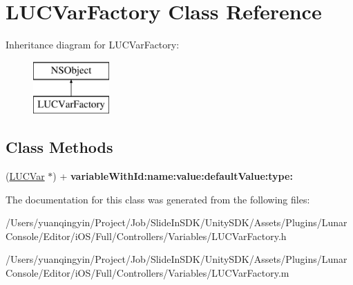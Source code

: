 \hypertarget{interface_l_u_c_var_factory}{}\section{L\+U\+C\+Var\+Factory Class Reference}
\label{interface_l_u_c_var_factory}
Inheritance diagram for L\+U\+C\+Var\+Factory\+:\begin{figure}[H]
\begin{center}
\leavevmode
\includegraphics[height=2.000000cm]{interface_l_u_c_var_factory}
\end{center}
\end{figure}
\subsection*{Class Methods}
\begin{DoxyCompactItemize}
\item 
\mbox{\label{interface_l_u_c_var_factory_a89d01d2c93c632f6231a2bb779eecea0}} 
(\mbox{\hyperlink{interface_l_u_c_var}{L\+U\+C\+Var}} $\ast$) + {\bfseries variable\+With\+Id\+:name\+:value\+:default\+Value\+:type\+:}
\end{DoxyCompactItemize}


The documentation for this class was generated from the following files\+:\begin{DoxyCompactItemize}
\item 
/\+Users/yuanqingyin/\+Project/\+Job/\+Slide\+In\+S\+D\+K/\+Unity\+S\+D\+K/\+Assets/\+Plugins/\+Lunar\+Console/\+Editor/i\+O\+S/\+Full/\+Controllers/\+Variables/L\+U\+C\+Var\+Factory.\+h\item 
/\+Users/yuanqingyin/\+Project/\+Job/\+Slide\+In\+S\+D\+K/\+Unity\+S\+D\+K/\+Assets/\+Plugins/\+Lunar\+Console/\+Editor/i\+O\+S/\+Full/\+Controllers/\+Variables/L\+U\+C\+Var\+Factory.\+m\end{DoxyCompactItemize}
